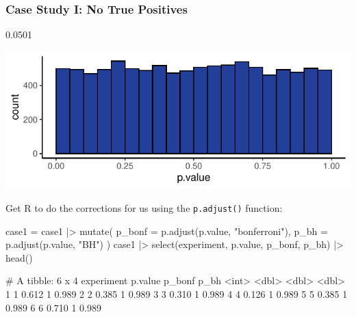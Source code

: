 \documentclass[a4paper]{article}\usepackage[]{graphicx}\usepackage[]{xcolor}
\makeatletter
\def\maxwidth{ %
  \ifdim\Gin@nat@width>\linewidth
    \linewidth
  \else
    \Gin@nat@width
  \fi
}
\makeatother
\begin{document}
\subsubsection{Case Study I: No True Positives}
\begin{Schunk}
\begin{Soutput}
[1] 0.0501
\end{Soutput}


{\centering \includegraphics[width=\maxwidth]{figure/listings-unnamed-chunk-213-1} 

}

\end{Schunk}
Get R to do the corrections for us using the \lstinline|p.adjust()| function:
\begin{Schunk}
\begin{Sinput}
case1 = case1 |> 
  mutate(
    p_bonf = p.adjust(p.value, 
                      "bonferroni"),
    p_bh = p.adjust(p.value, "BH")
  )
case1 |> select(experiment, p.value,
                 p_bonf, p_bh) |> 
  head()
\end{Sinput}
\begin{Soutput}
# A tibble: 6 x 4
  experiment p.value p_bonf  p_bh
       <int>   <dbl>  <dbl> <dbl>
1          1   0.612      1 0.989
2          2   0.385      1 0.989
3          3   0.310      1 0.989
4          4   0.126      1 0.989
5          5   0.385      1 0.989
6          6   0.710      1 0.989
\end{Soutput}
\end{Schunk}
\end{document}
